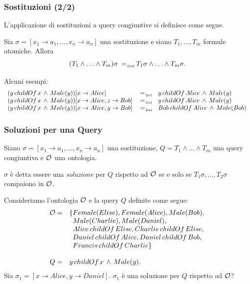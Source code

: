 \documentclass[8pt]{beamer}
\begin{document}
\begin{frame}
\frametitle{Sostituzioni (2/2)}

L'applicazione di sostituzioni a query congiuntive si definisce come segue.
\vspace{\baselineskip}

Sia $\sigma=[x_1 \rightarrow a_1, \ldots, x_n \rightarrow a_n]$ una sostituzione
e siano $T_1, \ldots, T_m$ formule atomiche. Allora
\[
 (T_1 \wedge \ldots \wedge T_m)\sigma \defAs T_1\sigma \wedge \ldots \wedge T_m\sigma . 
\]
\vspace{\baselineskip}

Alcuni esempi:
\[
 \begin{array}{lcl}
 (y\,childOf\,x\,\wedge\,Male(y))[x \rightarrow Alice] & \defAs & y\,childOf\,Alice\,\wedge\,Male(y)  \\
 (y\,childOf\,x\,\wedge\,Male(y))[x \rightarrow Alice, z \rightarrow Bob] & \defAs & y\,childOf\,Alice\,\wedge\,Male(y)  \\
 (y\,childOf\,x\,\wedge\,Male(y))[x \rightarrow Alice, y \rightarrow Bob] & \defAs & Bob\,childOf\,Alice\,\wedge\,Male(Bob)  \\
 \end{array}
\]
\end{frame}

\begin{frame}
\frametitle{Soluzioni per una Query}
Siano $\sigma=[x_1 \rightarrow a_1, \ldots, x_n \rightarrow a_n]$ una sostituzione,
$Q=T_1 \wedge \ldots \wedge T_m$ una query congiuntiva e $\mathcal{O}$ una ontologia.
\vspace{\baselineskip}

$\sigma$ \`e detta essere una \emph{soluzione} per $Q$ rispetto ad $\mathcal{O}$ se
e solo se $T_1\sigma, \ldots, T_2\sigma$ compaiono in $\mathcal{O}$. 
\vspace{\baselineskip}

Consideriamo l'ontologia $\mathcal{O}$ e la query $Q$ definite come segue:
\[
\begin{array}{cl}
  \Ont  =  &  \{Female(Elise), Female(Alice), Male(Bob), \\
  &\phantom{\{}Male(Charlie), Male(Daniel), \\
  &\phantom{\{}Alice\,childOf\,Elise, Charlie\,childOf\,Elise, \\
  &\phantom{\{}Daniel\,childOf\,Alice, Daniel\,childOf\,Bob, \\
  &\phantom{\{}Francis\,childOf\,Charlie \}\\
  &\\
  Q = & y\,childOf\,x\,\wedge\,Male(y) .
 \end{array}
\]
Sia $\sigma_1=[x \rightarrow Alice, y \rightarrow Daniel]$. $\sigma_1$ \`e una soluzione per $Q$
rispetto ad $\mathcal{O}$?
\end{frame}
\end{document}
